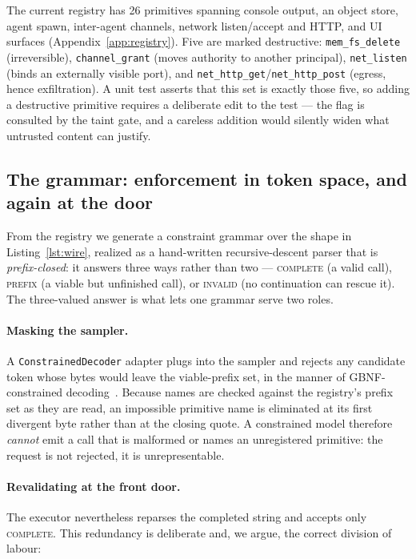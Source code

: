 \documentclass[11pt]{article}
\newcommand{\code}[1]{\texttt{#1}}
\begin{document}
The current registry has 26 primitives spanning console output, an object
store, agent spawn, inter-agent channels, network listen/accept and HTTP, and
UI surfaces (Appendix~\ref{app:registry}). Five are marked destructive:
\code{mem\_fs\_delete} (irreversible), \code{channel\_grant} (moves authority
to another principal), \code{net\_listen} (binds an externally visible port),
and \code{net\_http\_get}/\code{net\_http\_post} (egress, hence exfiltration).
A unit test asserts that this set is exactly those five, so adding a
destructive primitive requires a deliberate edit to the test --- the flag is
consulted by the taint gate, and a careless addition would silently widen what
untrusted content can justify.

\subsection{The grammar: enforcement in token space, and again at the door}
\label{sec:grammar}

From the registry we generate a constraint grammar over the shape in
Listing~\ref{lst:wire}, realized as a hand-written recursive-descent parser
that is \emph{prefix-closed}: it answers three ways rather than two ---
\textsc{complete} (a valid call), \textsc{prefix} (a viable but unfinished
call), or \textsc{invalid} (no continuation can rescue it). The three-valued
answer is what lets one grammar serve two roles.

\paragraph{Masking the sampler.} A \code{ConstrainedDecoder} adapter plugs
into the sampler and rejects any candidate token whose bytes would leave the
viable-prefix set, in the manner of GBNF-constrained
decoding~\cite{llamacpp,willard2023outlines}. Because names are checked
against the registry's prefix set as they are read, an impossible primitive
name is eliminated at its first divergent byte rather than at the closing
quote. A constrained model therefore \emph{cannot} emit a call that is
malformed or names an unregistered primitive: the request is not rejected, it
is unrepresentable.

\paragraph{Revalidating at the front door.} The executor nevertheless reparses
the completed string and accepts only \textsc{complete}. This redundancy is
deliberate and, we argue, the correct division of labour:
\end{document}
